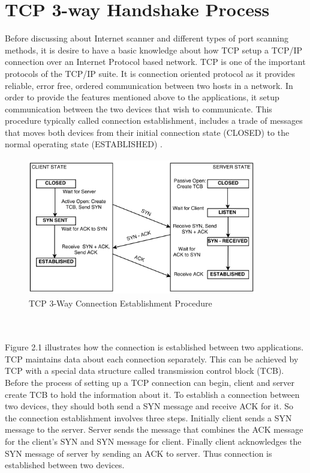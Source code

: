     \section{TCP 3-way Handshake Process}
    Before discussing about Internet scanner and different types of port scanning methods, it is desire to have a basic knowledge about how TCP setup a TCP/IP connection over an Internet Protocol based network.
    TCP is one of the important protocols of the TCP/IP suite.
    It is connection oriented protocol as it provides reliable, error free, ordered communication between two hosts in a network.
    In order to provide the features mentioned above to the applications, it setup communication between the two devices that wish to communicate.
    This procedure typically called connection establishment, includes a trade of messages that moves both devices from their initial connection state (CLOSED) to the normal operating state (ESTABLISHED) \cite{rfc761}.
    \begin{figure}[t]
    \centering
	\includegraphics[width=10cm, height=6cm]{images/tcp_handshake.png}
	\caption{TCP 3-Way Connection Establishment Procedure}
	\end{figure}
	\\\\
	Figure 2.1 illustrates how the connection is established between two applications.
	TCP maintains data about each connection separately.
	This can be achieved by TCP with a special data structure called transmission control block (TCB).
	Before the process of setting up a TCP connection can begin, client and server create TCB to hold the information about it.
	To establish a connection between two devices, they should both send a SYN message and receive ACK for it.
	So the connection establishment involves three steps.
	Initially client sends a SYN message to the server. 
	Server sends the message that combines the ACK message for the client's SYN and SYN message for client.
	Finally client acknowledges the SYN message of server by sending an ACK to server.
	Thus connection is established between two devices.
